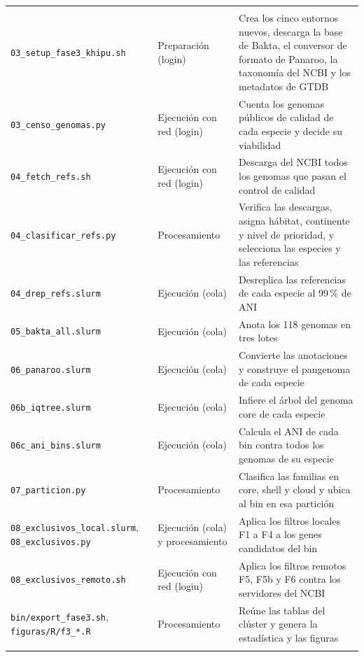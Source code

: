 {\begin{xltabular}{\textwidth}{>{\raggedright\arraybackslash}p{4.9cm}>{\raggedright\arraybackslash}p{2.6cm}>{\raggedright\arraybackslash}X}
\midrule
{} \\*
\addlinespace
\texttt{03\_setup\_fase3\_khipu.sh} & Preparación (login) & 
Crea los cinco entornos nuevos, descarga la base de Bakta, el conversor de
formato de Panaroo, la taxonomía del NCBI y los metadatos de GTDB \\
\addlinespace
\texttt{03\_censo\_genomas.py} & Ejecución con red (login) & 
Cuenta los genomas públicos de calidad de cada especie y decide su viabilidad \\
\addlinespace
\texttt{04\_fetch\_refs.sh} & Ejecución con red (login) & 
Descarga del NCBI todos los genomas que pasan el control de calidad \\
\addlinespace
\texttt{04\_clasificar\_refs.py} & Procesamiento & 
Verifica las descargas, asigna hábitat, continente y nivel de prioridad, y
selecciona las especies y las referencias \\
\addlinespace
\texttt{04\_drep\_refs.slurm} & Ejecución (cola) & 
Desreplica las referencias de cada especie al 99\,\% de ANI \\
\addlinespace
\texttt{05\_bakta\_all.slurm} & Ejecución (cola) & 
Anota los 118 genomas en tres lotes \\
\addlinespace
\texttt{06\_panaroo.slurm} & Ejecución (cola) & 
Convierte las anotaciones y construye el pangenoma de cada especie \\
\addlinespace
\texttt{06b\_iqtree.slurm} & Ejecución (cola) & 
Infiere el árbol del genoma core de cada especie \\
\addlinespace
\texttt{06c\_ani\_bins.slurm} & Ejecución (cola) & 
Calcula el ANI de cada bin contra todos los genomas de su especie \\
\addlinespace
\texttt{07\_particion.py} & Procesamiento & 
Clasifica las familias en core, shell y cloud y ubica al bin en esa partición \\
\addlinespace
\texttt{08\_exclusivos\_local.slurm}, \texttt{08\_exclusivos.py} & 
Ejecución (cola) y procesamiento & 
Aplica los filtros locales F1 a F4 a los genes candidatos del bin \\
\addlinespace
\texttt{08\_exclusivos\_remoto.sh} & Ejecución con red (login) & 
Aplica los filtros remotos F5, F5b y F6 contra los servidores del NCBI \\
\addlinespace
\texttt{bin/export\_fase3.sh}, \texttt{figuras/R/f3\_*.R} & Procesamiento & 
Reúne las tablas del clúster y genera la estadística y las figuras \\
\midrule
{} \\*

\end{xltabular}}
